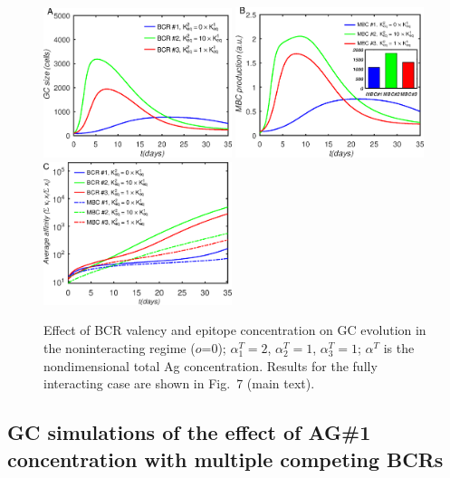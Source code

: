 \begin{figure}
\centering
\includegraphics[width=0.49\textwidth]{../figS6/gcsize.eps}
\includegraphics[width=0.49\textwidth]{../figS6/dmbc.eps}
\includegraphics[width=0.49\textwidth]{../figS6/A.eps}
\caption{Effect of BCR valency and epitope concentration on GC evolution in the noninteracting regime ($o$=0);
$\alpha_1^T=2$, $\alpha_2^T=1$, $\alpha_3^T=1$; $\alpha^T$ is the nondimensional total Ag concentration.
Results for the fully interacting case are shown in Fig.~7 (main text).
}
\label{fig:agc0}
\end{figure}

\vspace{1EM}
\subsection{
GC simulations of the effect of AG\#1 concentration with multiple competing BCRs}
\label{sec:fig7}

